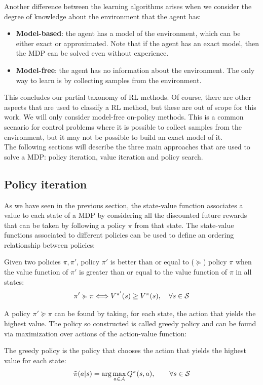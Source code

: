 Another difference between the learning algorithms arises when we consider the degree of knowledge about the environment that the agent has:
\begin{itemize}
\item \textbf{Model-based}: the agent has a model of the environment, which can be either exact or approximated. Note that if the agent has an exact model, then the MDP can be solved even without experience.
\item \textbf{Model-free}: the agent has no information about the environment. The only way to learn is by collecting samples from the environment.
\end{itemize}

This concludes our partial taxonomy of RL methods. Of course, there are other aspects that are used to classify a RL method, but these are out of scope for this work. We will only consider model-free on-policy methods. This is a common scenario for  control problems where it is possible to collect samples from the environment, but it may not be possible to build an exact model of it.\\
The following sections will describe the three main approaches that are used to solve a MDP: policy iteration, value iteration and policy search.

\subsection{Policy iteration}
As we have seen in the previous section, the state-value function associates a value to each state of a MDP by considering all the discounted future rewards that can be taken by following a policy $\pi$ from that state. The state-value functions associated to different policies can be used to define an ordering relationship between policies:

\begin{definition}
Given two policies $\pi, \pi'$, policy $\pi'$ is better than or equal to ($\succcurlyeq$) policy $\pi$ when the value function of $\pi'$ is greater than or equal to the value function of $\pi$ in all states:
\[
\pi' \succcurlyeq \pi \Longleftrightarrow V^{\pi'}(s) \geq V^{\pi}(s),\quad \forall s \in \mathcal{S}
\]
\end{definition}

A policy $\pi'\succcurlyeq\pi$ can be found by taking, for each state, the action that yields the highest value. The policy so constructed is called greedy policy and can be found via maximization over actions of the action-value function:
\begin{definition}
The greedy policy is the policy that chooses the action that yields the highest value for each state:
\[
\tilde{\pi}(a|s) = \arg\max_{a\in\mathcal{A}} Q^{\pi}(s,a), \qquad \forall s \in \mathcal{S}
\]
\end{definition}

